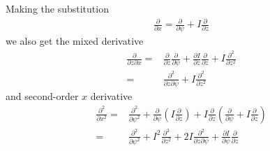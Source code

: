 \documentclass[12pt]{article}
\def\L{\left}
\def\R{\right}
\newcommand{\deriv}[2]{\ensuremath{\frac{\partial #1}{\partial #2}}}
\begin{document}
Making the substitution
%
\begin{align*}
\deriv{}{x} = \deriv{}{\psi} + I\deriv{}{z}
\end{align*}
%
we also get the mixed derivative
%
\begin{align*}
\frac{\partial}{\partial z\partial x} =& \deriv{}{z}\deriv{}{\psi} +
    \deriv{I}{z}\deriv{}{z} + I\frac{\partial^2}{\partial z^2} \nonumber \\ =&
    \frac{\partial^2}{\partial z\partial \psi} + I\frac{\partial^2}{\partial
    z^2}
\end{align*}
%
and second-order $x$ derivative
%
\begin{align*}
\frac{\partial^2}{\partial x^2} =& \frac{\partial^2}{\partial \psi^2} +
    \deriv{}{\psi}\L(I\deriv{}{z}\R) + I\deriv{}{z}\L(\deriv{}{\psi} +
    I\deriv{}{z}\R) \nonumber \\ =& \frac{\partial^2}{\partial \psi^2} +
    I^2\frac{\partial^2}{\partial z^2} + 2I\frac{\partial^2}{\partial z\partial
    \psi} + \deriv{I}{\psi}\deriv{}{z}
\end{align*}
%
\end{document}
